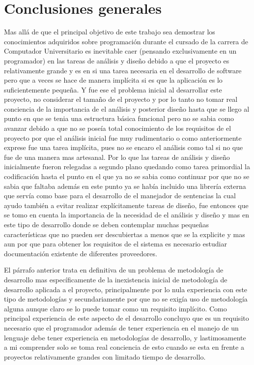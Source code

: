 \section{Conclusiones generales}    
%
Mas allá de que el principal objetivo de este trabajo sea demostrar los conocimientos adquiridos sobre programación durante el cursado de la carrera de Computador Universitario es inevitable caer (pensando exclusivamente en un programador) en las tareas de análisis y diseño debido a que el proyecto es relativamente grande y es en si una tarea necesaria en el desarrollo de software pero que a veces se hace de manera implícita si es que la aplicación es lo suficientemente pequeña. Y fue ese el problema inicial al desarrollar este proyecto, no considerar el tamaño de el proyecto y por lo tanto no tomar real conciencia de la importancia de el análisis y posterior diseño hasta que se llego al punto en que se tenia una estructura básica funcional pero no se sabia como avanzar debido a que no se poseía total conocimiento de los requisitos de el proyecto por que el análisis inicial fue muy rudimentario o como anteriormente exprese fue una tarea implícita, pues no se encaro el análisis como tal si no que fue de una manera mas artesanal. Por lo que las tareas de análisis y diseño inicialmente fueron relegadas a segundo plano quedando como tarea primordial la codificación hasta el punto en el que ya no se sabia como continuar por que no se sabia que faltaba además en este punto ya se había incluido una librería externa que servía como base para el desarrollo de el manejador de sentencias la cual ayudo también a evitar realizar explícitamente tareas de diseño, fue entonces que se tomo en cuenta la importancia de la necesidad de el análisis y diseño y mas en este tipo de desarrollo donde se deben contemplar muchas pequeñas características que no pueden ser descubiertas a menos que se la explicite y mas aun por que para obtener los requisitos de el sistema es necesario estudiar documentación existente de diferentes proveedores.

El párrafo anterior trata en definitiva de un problema de metodología de desarrollo mas específicamente de la inexistencia inicial de metodología de desarrollo aplicada a el proyecto, principalmente por lo nula experiencia con este tipo de metodologías y secundariamente por que no se exigía uso de metodología alguna aunque claro se lo puede tomar como un requisito implícito. Como principal experiencia de este aspecto de el desarrollo concluyo que es un requisito necesario que el programador además de tener experiencia en el manejo de un lenguaje debe tener experiencia en metodologías de desarrollo, y lastimosamente a mi comprender solo se toma real conciencia de esto cuando se esta en frente a proyectos relativamente grandes con limitado tiempo de desarrollo.


